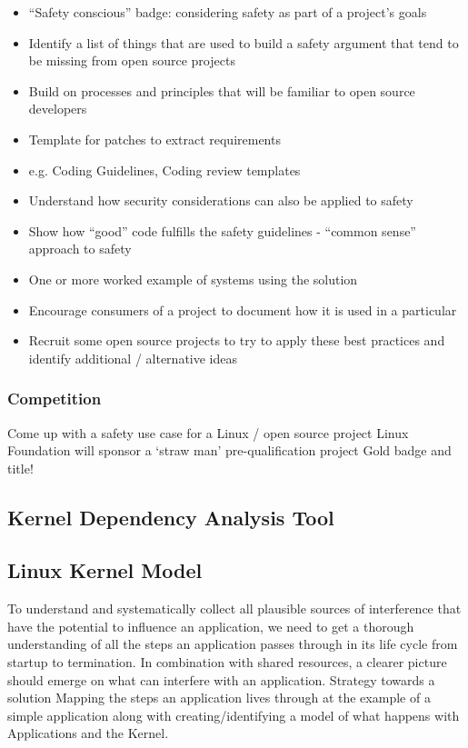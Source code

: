 \documentclass[12pt]{ElisaPaper}
\begin{document}
\begin{itemize}
\item “Safety conscious” badge: considering safety as part of a project’s goals
\item Identify a list of things that are used to build a safety argument that tend to be missing from open source projects
\item Build on processes and principles that will be familiar to open source developers
\item Template for patches to extract requirements
\item e.g. Coding Guidelines, Coding review templates
\item Understand how security considerations can also be applied to safety
\item Show how “good” code fulfills the safety guidelines - “common sense” approach to safety
\item One or more worked example of systems using the solution
\item Encourage consumers of a project to document how it is used in a particular 
\item Recruit some open source projects to try to apply these best practices and identify additional / alternative ideas
\end{itemize}

\subsubsection{Competition}

Come up with a safety use case for a Linux / open source project
Linux Foundation will sponsor a ‘straw man’ pre-qualification project
Gold badge and title!



\subsection{Kernel Dependency Analysis Tool}

\subsection{Linux Kernel Model}
To understand and systematically collect all plausible sources of interference that have the potential to influence an application, we need to get a thorough understanding of all the steps an application passes through in its life cycle from startup to termination. In combination with shared resources, a clearer picture should emerge on what can interfere with an application.
Strategy towards a solution
Mapping the steps an application lives through at the example of a simple application along with creating/identifying a model of what happens with Applications and the Kernel.  
\end{document}
